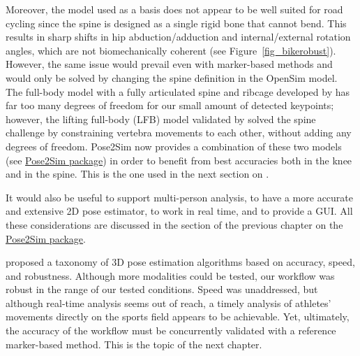 Moreover, the \cite{Rajagopal2016} model used as a basis does not appear to be well suited for road cycling since the spine is designed as a single rigid bone that cannot bend. This results in sharp shifts in hip abduction/adduction and internal/external rotation angles, which are not biomechanically coherent (see Figure~\ref{fig_bikerobust}). However, the same issue would prevail even with marker-based methods and would only be solved by changing the spine definition in the OpenSim model. The full-body model with a fully articulated spine and ribcage developed by \cite{Bruno2015} has far too many degrees of freedom for our small amount of detected keypoints; however, the lifting full-body (LFB) model validated by \cite{Beaucage-Gauvreau2019} solved the spine challenge by constraining vertebra movements to each other, without adding any degrees of freedom. Pose2Sim now provides a combination of these two models (see \hyperref[ch:3]{Pose2Sim package}) in order to benefit from best accuracies both in the knee and in the spine. This is the one used in the next section on .

It would also be useful to support multi-person analysis, to have a more accurate and extensive 2D pose estimator, to work in real time, and to provide a GUI. All these considerations are discussed in the  section of the previous chapter on the \hyperref[ch:3]{Pose2Sim package}.

\cite{Desmarais2021} proposed a taxonomy of 3D pose estimation algorithms based on accuracy, speed, and robustness. Although more modalities could be tested, our workflow was robust in the range of our tested conditions. Speed was unaddressed, but although real-time analysis seems out of reach, a timely analysis of athletes' movements directly on the sports field appears to be achievable. Yet, ultimately, the accuracy of the workflow must be concurrently validated with a reference marker-based method. This is the topic of the next chapter.